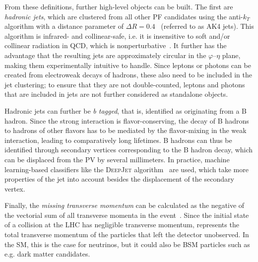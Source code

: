 From these definitions, further high-level objects can be built. The first are \textit{hadronic jets}, which are clustered from all other PF candidates using the anti-$k_T$ algorithm with a distance parameter of $\Delta R = 0.4$~\cite{Cacciari:2008gp} (referred to as AK4 jets). This algorithm is infrared- and collinear-safe, i.e. it is insensitive to soft and/or collinear radiation in QCD, which is nonperturbative~\cite{Skands:2012ts}. It further has the advantage that the resulting jets are approximately circular in the $\varphi$--$\eta$ plane, making them experimentally intuitive to handle. Since leptons or photons can be created from electroweak decays of hadrons, these also need to be included in the jet clustering; to ensure that they are not double-counted, leptons and photons that are included in jets are not further considered as standalone objects.

Hadronic jets can further be \textit{b tagged}, that is, identified as originating from a B hadron. Since the strong interaction is flavor-conserving, the decay of B hadrons to hadrons of other flavors has to be mediated by the flavor-mixing in the weak interaction, leading to comparatively long lifetimes. B hadrons can thus be identified through secondary vertices corresponding to the B hadron decay, which can be displaced from the PV by several millimeters. In practice, machine learning-based classifiers like the \textsc{DeepJet} algorithm~\cite{DeepJet:2020} are used, which take more properties of the jet into account besides the displacement of the secondary vertex.

Finally, the \textit{missing transverse momentum} \ptmissvec can be calculated as the negative of the vectorial sum of all transverse momenta in the event~\cite{CMS:JME-17-001}. Since the initial state of a collision at the LHC has negligible transverse momentum, \ptmissvec represents the total transverse momentum of the particles that left the detector unobserved. In the SM, this is the case for neutrinos, but it could also be BSM particles such as e.g. dark matter candidates.

